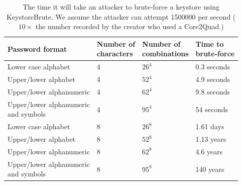\documentclass[12pt, titlepage]{article}
\begin{document}
\begin{center}
\begin{table}[h!]
    \begin{tabular}{ | l | l | l | l |}
    \hline
    \textbf{Password format} & \shortstack{\textbf{Number of} \\ \textbf{characters}} & \shortstack{\textbf{Number of} \\ \textbf{combinations}} & \shortstack{\textbf{Time to} \\ \textbf{brute-force}} \\ \hline
    Lower case alphabet  & 4 & $26^4$ & 0.3 seconds \\ \hline
    Upper/lower alphabet  & 4 & $52^4$ & 4.9 seconds \\ \hline
    Upper/lower alphanumeric & 4 & $62^4$ & 9.8 seconds \\ \hline
    \shortstack{Upper/lower alphanumeric \\ and symbols}  & 4 & $95^4$ & 54 seconds \\ \hline
    Lower case alphabet  & 8 & $26^8$ & 1.61 days \\ \hline
    Upper/lower alphabet  & 8 & $52^8$ & 1.13 years \\ \hline
    Upper/lower alphanumeric & 8 & $62^8$ & 4.6 years \\ \hline
    \shortstack{Upper/lower alphanumeric \\ and symbols}  & 8 & $95^8$ & 140 years \\ \hline
    
    \end{tabular}
    \caption{The time it will take an attacker to brute-force a keystore using KeystoreBrute. We assume the attacker can attempt 1500000 per second ($10 \times$ the number recorded by the creator who used a Core2Quad.)} \label{tab:keystoreBruteforce}
    \end{table}
\end{center}
\end{document}
